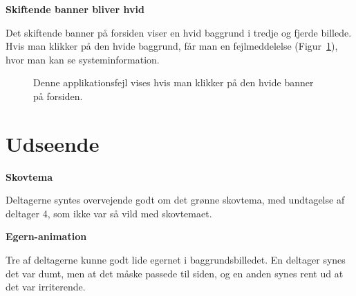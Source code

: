 \documentclass[10pt,a4paper]{article}      %
\newcommand\pic[1]{\texttt{[image: Pics/\#1]}}
\renewcommand\good{\pic{good}}
\renewcommand\smallproblem{\pic{smallproblem}}
\renewcommand\seriousproblem{\pic{seriousproblem}}
\begin{document}
\begin{kommentarer}
  \item[\seriousproblem]{\textbf{Skiftende banner bliver hvid}}

  Det skiftende banner på forsiden viser en hvid baggrund i tredje og fjerde
  billede. Hvis man klikker på den hvide baggrund, får man en fejlmeddelelse
  (Figur~\ref{fig:fejlmeddelelse}), hvor man kan se systeminformation.
\end{kommentarer}

\begin{figure}[htbp]
    \centering
    \caption{Denne applikationsfejl vises hvis man klikker på den hvide banner
    på forsiden.}
    \label{fig:fejlmeddelelse}
\end{figure}

\section{Udseende}
\begin{kommentarer}
  \item[\good]{\textbf{Skovtema}}
  
  Deltagerne syntes overvejende godt om det grønne skovtema, med
  undtagelse af deltager 4, som ikke var så vild med skovtemaet.

  \item[\smallproblem]{\textbf{Egern-animation}} 
  
  Tre af deltagerne kunne godt lide egernet i baggrundsbilledet. En deltager
  synes det var dumt, men at det måske passede til siden, og en anden synes rent
  ud at det var irriterende.
\end{kommentarer}
\end{document}
